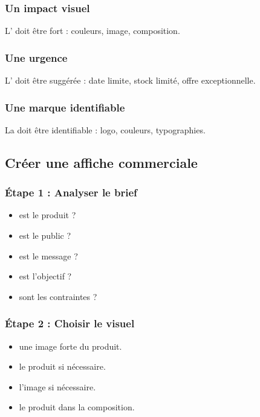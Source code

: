 \subsubsection{Un impact visuel}

L' doit être fort : couleurs, image, composition.

\subsubsection{Une urgence}

L' doit être suggérée : date limite, stock limité, offre exceptionnelle.

\subsubsection{Une marque identifiable}

La  doit être identifiable : logo, couleurs, typographies.

\subsection{Créer une affiche commerciale}

\subsubsection{Étape 1 : Analyser le brief}

\begin{itemize}
    \item {} est le produit ?
    \item {} est le public ?
    \item {} est le message ?
    \item {} est l'objectif ?
    \item {} sont les contraintes ?
\end{itemize}

\subsubsection{Étape 2 : Choisir le visuel}

\begin{itemize}
    \item {} une image forte du produit.
    \item {} le produit si nécessaire.
    \item {} l'image si nécessaire.
    \item {} le produit dans la composition.
\end{itemize}

